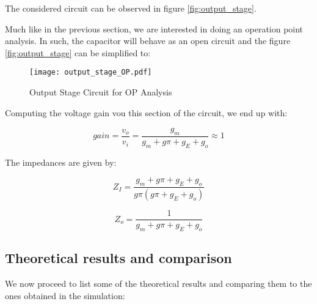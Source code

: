 The considered circuit can be observed in figure \ref{fig:output_stage}.


Much like in the previous section, we are interested in doing an operation point analysis. In such, the capacitor will behave as an open circuit and the figure \ref{fig:output_stage} can be simplified to:

\begin{figure}[h!]
\centering
\texttt{[image: output\_stage\_OP.pdf]}
\caption{Output Stage Circuit for OP Analysis}
\label{fig:output_stage_figure_OP}
\end{figure}


Computing the voltage gain vou this section of the circuit, we end up with:

\begin{equation}
gain=\frac{v_o}{v_i}=\frac{g_m}{g_m+g{\pi}+g_E+g_o} \approx 1
\end{equation}

The impedances are given by:

\begin{equation}
Z_I=\frac{g_m+g{\pi}+g_E+g_o}{g{\pi}(g{\pi}+g_E+g_o)}
\end{equation}


\begin{equation}
Z_o=\frac{1}{g_m+g{\pi}+g_E+g_o}
\end{equation}

\subsection {Theoretical results and comparison}

We now proceed to list some of the theoretical results and comparing them to the ones obtained in the simulation:

